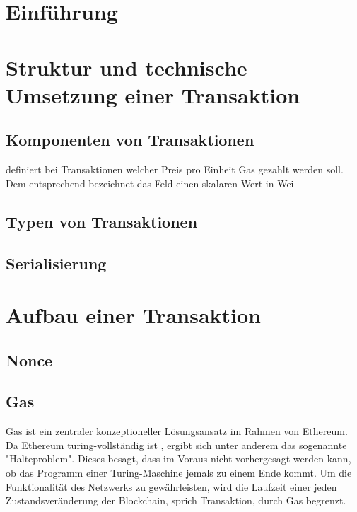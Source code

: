 \documentclass{llncs}
\begin{document}
\section{Einführung}
% 

\section{Struktur und technische Umsetzung einer Transaktion}
\subsection{Komponenten von Transaktionen}
definiert bei Transaktionen welcher Preis pro Einheit Gas gezahlt werden soll. Dem entsprechend bezeichnet das Feld einen skalaren Wert in Wei
\subsection{Typen von Transaktionen}
\subsection{Serialisierung}

\section{Aufbau einer Transaktion}

\subsection{Nonce}

\subsection{Gas}

Gas ist ein zentraler konzeptioneller Lösungsansatz im Rahmen von Ethereum. Da Ethereum turing-vollständig ist \cite[S. 1]{wood_ethereum/yellowpaper_2019}, ergibt sich unter anderem das sogenannte "Halteproblem". Dieses besagt, dass im Voraus nicht vorhergesagt werden kann, ob das Programm einer Turing-Maschine jemals zu einem Ende kommt. \cite[S.70]{davis_computability_2013} Um die Funktionalität des Netzwerks zu gewährleisten, wird die Laufzeit einer jeden Zustandsveränderung der Blockchain, sprich Transaktion, durch Gas begrenzt.
\end{document}
